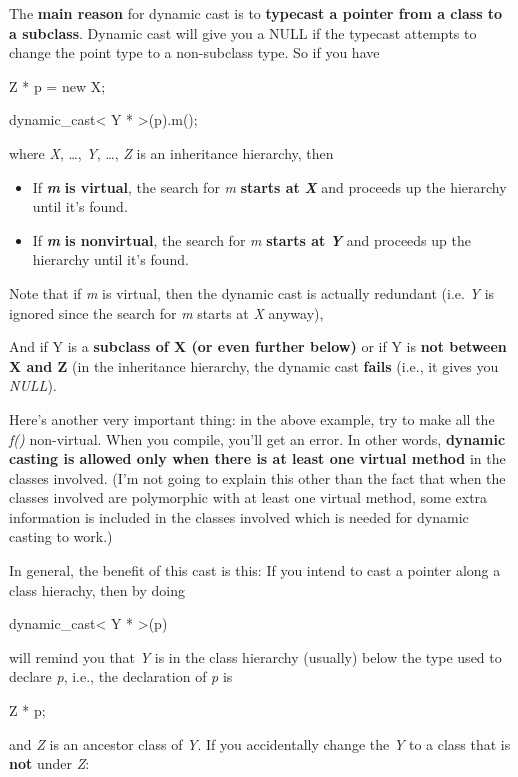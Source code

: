\documentclass[
]{article}
\providecommand{\tightlist}{%
  \setlength{\itemsep}{0pt}\setlength{\parskip}{0pt}}
\begin{document}
The \textbf{main reason} for dynamic cast is to \textbf{typecast a
pointer from a class to a subclass}. Dynamic cast will give you a NULL
if the typecast attempts to change the point type to a non-subclass
type. So if you have

Z * p = new X;

dynamic\_cast\textless{} Y * \textgreater(p).m();

where \emph{X}, \ldots, \emph{Y}, \ldots, \emph{Z} is an inheritance
hierarchy, then

\begin{itemize}
\tightlist
\item
  If \emph{\textbf{m}}\textbf{ is virtual}, the search for \emph{m}
  \textbf{starts at }\emph{\textbf{X}} and proceeds up the hierarchy
  until it's found.
\item
  If \emph{\textbf{m}}\textbf{ is nonvirtual}, the search for \emph{m}
  \textbf{starts at }\emph{\textbf{Y}} and proceeds up the hierarchy
  until it's found.
\end{itemize}

Note that if \emph{m} is virtual, then the dynamic cast is actually
redundant (i.e. \emph{Y} is ignored since the search for \emph{m} starts
at \emph{X} anyway),

And if Y is a \textbf{subclass of X (or even further below)} or if Y is
\textbf{not between X and Z} (in the inheritance hierarchy, the dynamic
cast \textbf{fails} (i.e., it gives you \emph{NULL}).

Here's another very important thing: in the above example, try to make
all the \emph{f()} non-virtual. When you compile, you'll get an error.
In other words, \textbf{dynamic casting is allowed only when there is at
least one virtual method} in the classes involved. (I'm not going to
explain this other than the fact that when the classes involved are
polymorphic with at least one virtual method, some extra information is
included in the classes involved which is needed for dynamic casting to
work.)

In general, the benefit of this cast is this: If you intend to cast a
pointer along a class hierachy, then by doing

dynamic\_cast\textless{} Y * \textgreater(p)

will remind you that \emph{Y} is in the class hierarchy (usually) below
the type used to declare \emph{p}, i.e., the declaration of \emph{p} is

Z * p;

and \emph{Z} is an ancestor class of \emph{Y}. If you accidentally
change the \emph{Y} to a class that is \textbf{not} under \emph{Z}:
\end{document}
